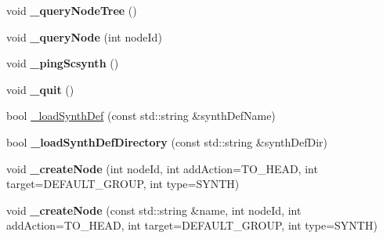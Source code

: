\begin{DoxyCompactItemize}
\item 
\hypertarget{classColliderPlusPlus_1_1Client__Server_ac71996de28e349d32bc5d6aef07524ac}{void {\bfseries \-\_\-query\-Node\-Tree} ()}\label{classColliderPlusPlus_1_1Client__Server_ac71996de28e349d32bc5d6aef07524ac}

\item 
\hypertarget{classColliderPlusPlus_1_1Client__Server_aa7b293e8b9e4b75a46d78a169962a243}{void {\bfseries \-\_\-query\-Node} (int node\-Id)}\label{classColliderPlusPlus_1_1Client__Server_aa7b293e8b9e4b75a46d78a169962a243}

\item 
\hypertarget{classColliderPlusPlus_1_1Client__Server_a49d7fa9a360a1fe8b32b9cabc8e4fafc}{void {\bfseries \-\_\-ping\-Scsynth} ()}\label{classColliderPlusPlus_1_1Client__Server_a49d7fa9a360a1fe8b32b9cabc8e4fafc}

\item 
\hypertarget{classColliderPlusPlus_1_1Client__Server_a4f32e463940de2cdad9817c0bf63ae7c}{void {\bfseries \-\_\-quit} ()}\label{classColliderPlusPlus_1_1Client__Server_a4f32e463940de2cdad9817c0bf63ae7c}

\item 
bool \hyperlink{classColliderPlusPlus_1_1Client__Server_a8aba41e38cf5d292adf2b759ff637f79}{\-\_\-load\-Synth\-Def} (const std\-::string \&synth\-Def\-Name)
\item 
\hypertarget{classColliderPlusPlus_1_1Client__Server_ab980baddbd3905e2dc8b429d2b71d83c}{bool {\bfseries \-\_\-load\-Synth\-Def\-Directory} (const std\-::string \&synth\-Def\-Dir)}\label{classColliderPlusPlus_1_1Client__Server_ab980baddbd3905e2dc8b429d2b71d83c}

\item 
\hypertarget{classColliderPlusPlus_1_1Client__Server_a29c6c0fd0bd45dc08520f7899954dbdf}{void {\bfseries \-\_\-create\-Node} (int node\-Id, int add\-Action=T\-O\-\_\-\-H\-E\-A\-D, int target=D\-E\-F\-A\-U\-L\-T\-\_\-\-G\-R\-O\-U\-P, int type=S\-Y\-N\-T\-H)}\label{classColliderPlusPlus_1_1Client__Server_a29c6c0fd0bd45dc08520f7899954dbdf}

\item 
\hypertarget{classColliderPlusPlus_1_1Client__Server_a132d13603d1a0f2c51eff83718e8561d}{void {\bfseries \-\_\-create\-Node} (const std\-::string \&name, int node\-Id, int add\-Action=T\-O\-\_\-\-H\-E\-A\-D, int target=D\-E\-F\-A\-U\-L\-T\-\_\-\-G\-R\-O\-U\-P, int type=S\-Y\-N\-T\-H)}\label{classColliderPlusPlus_1_1Client__Server_a132d13603d1a0f2c51eff83718e8561d}


\end{DoxyCompactItemize}
